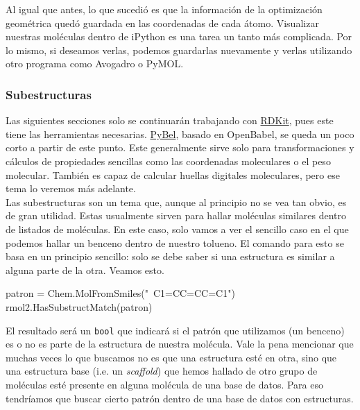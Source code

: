 \documentclass[10pt,letterpaper]{article}
\newcommand{\inlinecode}[1]{
\colorbox{light-gray}{\texttt{#1}}
}
\newenvironment{Code}
{
\begin{lrbox}{\selvestebox}%
\begin{minipage}{\dimexpr\columnwidth-2\fboxsep\relax}
\fontfamily{\ttdefault}\selectfont
}
{\end{minipage}\end{lrbox}%
\begin{center}
\colorbox{light-gray}{\usebox{\selvestebox}}
\end{center}
}
\begin{document}
Al igual que antes, lo que sucedi\'o es que la informaci\'on de la optimizaci\'on geom\'etrica qued\'o guardada en las coordenadas de cada \'atomo. Visualizar nuestras mol\'eculas dentro de iPython es una tarea un tanto m\'as complicada. Por lo mismo, si deseamos verlas, podemos guardarlas nuevamente y verlas utilizando otro programa como Avogadro o PyMOL.

\subsubsection{Subestructuras}
Las siguientes secciones solo se continuar\'an trabajando con \href{http://www.rdkit.org/docs/GettingStartedInPython.html}{RDKit}, pues este tiene las herramientas necesarias. \href{http://openbabel.org/docs/current/UseTheLibrary/Python_Pybel.html}{PyBel}, basado en OpenBabel, se queda un poco corto a partir de este punto. Este generalmente sirve solo para transformaciones y c\'alculos de propiedades sencillas como las coordenadas moleculares o el peso molecular. Tambi\'en es capaz de calcular huellas digitales moleculares, pero ese tema lo veremos m\'as adelante.\\

Las subestructuras son un tema que, aunque al principio no se vea tan obvio, es de gran utilidad. Estas usualmente sirven para hallar mol\'eculas similares dentro de listados de mol\'eculas. En este caso, solo vamos a ver el sencillo caso en el que podemos hallar un benceno dentro de nuestro tolueno. El comando para esto se basa en un principio sencillo: solo se debe saber si una estructura es similar a alguna parte de la otra. Veamos esto.\\

\begin{Code}
patron = Chem.MolFromSmiles("\ \hspace*{-2mm}C1=CC=CC=C1")\\
rmol2.HasSubstructMatch(patron)
\end{Code}

El resultado ser\'a un \inlinecode{bool} que indicar\'a si el patr\'on que utilizamos (un benceno) es o no es parte de la estructura de nuestra mol\'ecula. Vale la pena mencionar que muchas veces lo que buscamos no es que una estructura est\'e en otra, sino que una estructura base (i.e. un \emph{scaffold}) que hemos hallado de otro grupo de mol\'eculas est\'e presente en alguna mol\'ecula de una base de datos. Para eso tendr\'iamos que buscar cierto patr\'on dentro de una base de datos con estructuras.
\end{document}
